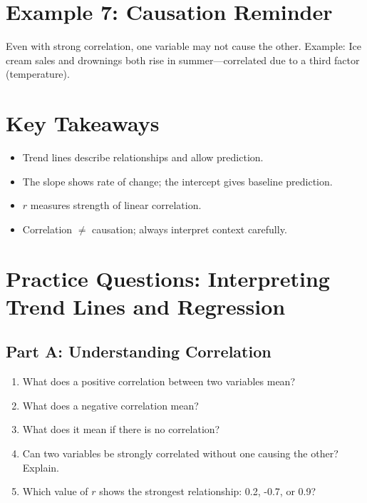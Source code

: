 \documentclass[12pt]{article}
\begin{document}
\section*{Example 7: Causation Reminder}

Even with strong correlation, one variable may not cause the other.  
Example: Ice cream sales and drownings both rise in summer—correlated due to a third factor (temperature).

\section*{Key Takeaways}
\begin{itemize}
  \item Trend lines describe relationships and allow prediction.
  \item The slope shows rate of change; the intercept gives baseline prediction.
  \item \(r\) measures strength of linear correlation.
  \item Correlation $\neq$ causation; always interpret context carefully.
\end{itemize}

\newpage


\section*{Practice Questions: Interpreting Trend Lines and Regression}

\subsection*{Part A: Understanding Correlation}
\begin{enumerate}
  \item What does a positive correlation between two variables mean?
  \item What does a negative correlation mean?
  \item What does it mean if there is no correlation?
  \item Can two variables be strongly correlated without one causing the other? Explain.
  \item Which value of \(r\) shows the strongest relationship: 0.2, -0.7, or 0.9?
\end{enumerate}
\end{document}
